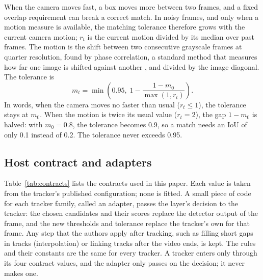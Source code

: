 \documentclass[pdflatex,sn-mathphys-num,iicol]{sn-jnl}
\begin{document}
When the camera moves fast, a box moves more between two frames, and a fixed
overlap requirement can break a correct match. In noisy frames, and only when
a motion measure is available, the matching tolerance therefore grows with
the current camera motion; $r_t$ is the current motion divided by its median
over past frames. The motion is the shift between two consecutive grayscale
frames at quarter resolution, found by phase correlation, a standard method
that measures how far one image is shifted against another
\cite{reddy1996phasecorr}, and divided by the image diagonal. The tolerance is
\begin{equation}
m_t=\min\!\left(0.95,\;1-\frac{1-m_0}{\max(1,r_t)}\right).
\label{eq:motion}
\end{equation}
In words, when the camera moves no faster than usual ($r_t\le1$), the
tolerance stays at $m_0$. When the motion is twice its usual value
($r_t=2$), the gap $1-m_0$ is halved: with $m_0=0.8$, the tolerance becomes
0.9, so a match needs an IoU of only 0.1 instead of 0.2. The tolerance never
exceeds 0.95.

\subsection{Host contract and adapters}\label{sec:contract}
Table~\ref{tab:contracts} lists the contracts used in this paper. Each value
is taken from the tracker's published configuration; none is fitted. A small
piece of code for each tracker family, called an adapter, passes the layer's
decision to the tracker:
the chosen candidates and their scores replace the detector output of the
frame, and the new thresholds and tolerance replace the tracker's own for
that frame. Any step that the authors apply after tracking, such as
filling short gaps in tracks (interpolation) or linking tracks after the video
ends, is kept. The rules and their constants are
the same for every tracker. A tracker enters only through its four contract
values, and the adapter only passes on the decision; it never makes one.
\end{document}
